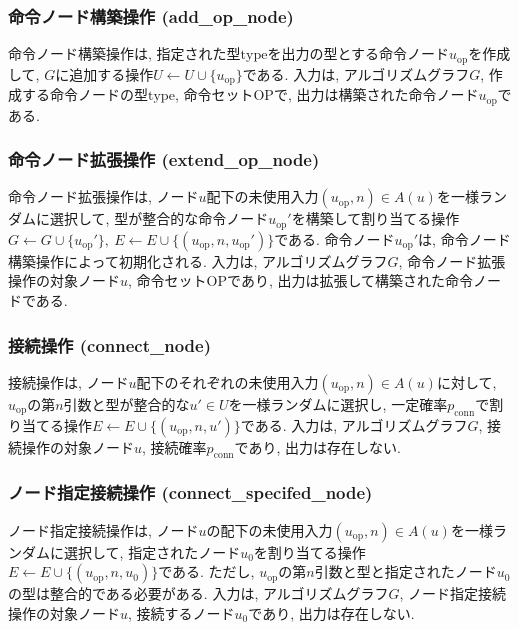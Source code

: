 \documentclass[11pt,oneside,openany,report]{jsbook}
\begin{document}
\subsubsection{命令ノード構築操作 (add\_op\_node)}

命令ノード構築操作は, 指定された型$\mathrm{type}$を出力の型とする命令ノード$u_\mathrm{op}$を作成して, $G$に追加する操作$U \leftarrow U \cup \{ u_\mathrm{op} \}$である. 入力は, アルゴリズムグラフ$G$, 作成する命令ノードの型$\mathrm{type}$, 命令セット$\mathrm{OP}$で, 出力は構築された命令ノード$u_\mathrm{op}$である.

\subsubsection{命令ノード拡張操作 (extend\_op\_node)}
命令ノード拡張操作は, ノード$u$配下の未使用入力$(u_\mathrm{op},n) \in A(u)$を一様ランダムに選択して, 型が整合的な命令ノード$u_\mathrm{op}'$を構築して割り当てる操作$G \leftarrow G \cup \{ u_\mathrm{op}' \},\ E \leftarrow E \cup \{ (u_\mathrm{op}, n, u_\mathrm{op}') \} $である. 命令ノード$u_\mathrm{op}'$は, 命令ノード構築操作によって初期化される. 入力は, アルゴリズムグラフ$G$, 命令ノード拡張操作の対象ノード$u$, 命令セット$\mathrm{OP}$であり, 出力は拡張して構築された命令ノードである.

\subsubsection{接続操作 (connect\_node)}
接続操作は, ノード$u$配下のそれぞれの未使用入力$(u_\mathrm{op},n) \in A(u)$に対して, $u_\mathrm{op}$の第$n$引数と型が整合的な$u' \in U$を一様ランダムに選択し, 一定確率$p_\mathrm{conn}$で割り当てる操作$E \leftarrow E \cup \{ (u_\mathrm{op}, n, u') \} $である. 入力は, アルゴリズムグラフ$G$, 接続操作の対象ノード$u$, 接続確率$p_\mathrm{conn}$であり, 出力は存在しない.

\subsubsection{ノード指定接続操作 (connect\_specifed\_node)}
ノード指定接続操作は, ノード$u$の配下の未使用入力$(u_\mathrm{op},n) \in A(u)$を一様ランダムに選択して, 指定されたノード$u_0$を割り当てる操作$E \leftarrow E \cup \{ (u_\mathrm{op}, n, u_0) \} $である. ただし, $u_\mathrm{op}$の第$n$引数と型と指定されたノード$u_0$の型は整合的である必要がある. 入力は, アルゴリズムグラフ$G$, ノード指定接続操作の対象ノード$u$, 接続するノード$u_0$であり, 出力は存在しない.
\end{document}
